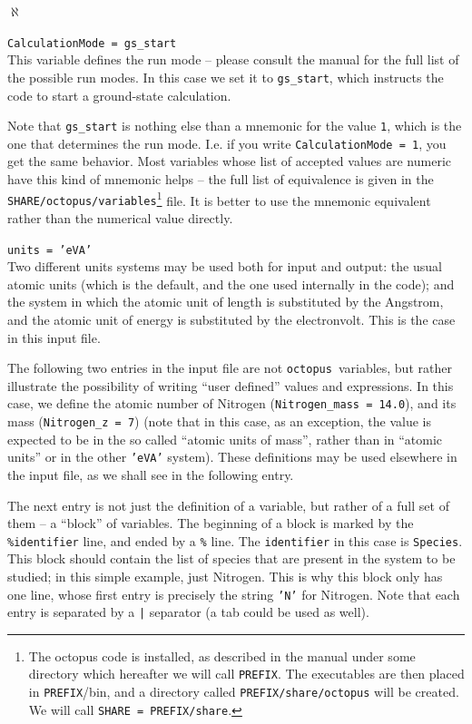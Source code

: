 \documentclass[10pt,a4paper,twoside]{article}
\newcommand{\octopus}{{\tt octopus}\ }
\newenvironment{mylist}
{
\begin{list}{$\aleph$}
{
\setlength{\parskip}{0pt}
\setlength{\topsep}{0pt}
\setlength{\partopsep}{0pt}
\setlength{\itemsep}{0pt}
\setlength{\parsep}{0pt}
}
}
{
\end{list}
}
\begin{document}
\begin{mylist}
\item {\tt CalculationMode = gs\_start}\\
This variable defines the run mode -- please consult the manual for the
full list of the possible run modes. In this case we set it to {\tt gs\_start},
which instructs the code to start a ground-state calculation.

Note that {\tt gs\_start} is nothing else than a mnemonic for
the value {\tt 1}, which is the one that determines the run mode. I.e. if
you write {\tt CalculationMode = 1}, you get the same behavior. Most
variables whose list of accepted values are numeric have this kind of mnemonic
helps -- the full list of equivalence is given in the {\tt SHARE/octopus/variables}\footnote{
The octopus code is installed, as described in the manual under some directory
which hereafter we will call {\tt PREFIX}. The executables are then placed
in {\tt PREFIX}/bin, and a directory called {\tt PREFIX/share/octopus} will be created.
We will call {\tt SHARE = PREFIX/share}.}
file. It is better to use the mnemonic equivalent rather than the numerical
value directly.
\item {\tt units = 'eVA'}\\
Two different units systems may be used both for input and output: the usual
atomic units (which is the default, and the one used internally in the code);
and the system in which the atomic unit of length is substituted by the Angstrom, and
the atomic unit of energy is substituted by the electronvolt. This is the case in
this input file.
\item The following two entries in the input file are not \octopus variables,
but rather illustrate the possibility of writing ``user defined'' values and
expressions. In this case, we define the atomic number of Nitrogen
({\tt Nitrogen\_mass = 14.0}), and its
mass ({\tt Nitrogen\_z = 7}) (note that in this case, as an exception, the value is expected to be in
the so called ``atomic units of mass'', rather than in ``atomic units'' or
in the other {\tt 'eVA'} system). These definitions may be used elsewhere in the input file,
as we shall see in the following entry.
\item The next entry is not just the definition of a variable, but rather
of a full set of them -- a ``block'' of variables. The beginning of a block
is marked by the {\tt \%identifier} line, and ended by a {\tt \%} line.
The {\tt identifier} in this case is {\tt Species}. This block should contain
the list of species that are present in the system to be studied; in this
simple example, just Nitrogen. This is why this block only has one line, 
whose first entry is precisely the string {\tt 'N'} for Nitrogen. Note that each entry
is separated by a {\tt |} separator (a {\sc tab} could be used as well).


\end{mylist}
\end{document}
